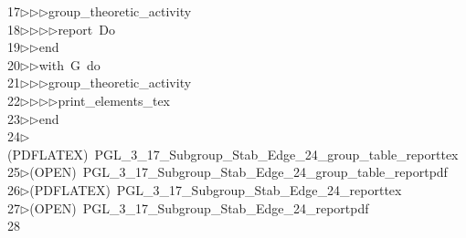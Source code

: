\begin{tabbing}
17\>$\triangleright$\>$\triangleright$\>$\triangleright$\>group\_theoretic\_activity\ \\[0pt]
18\>$\triangleright$\>$\triangleright$\>$\triangleright$\>$\triangleright$\>report\ Do\ \\[0pt]
19\>$\triangleright$\>$\triangleright$\>end\ \\[0pt]
20\>$\triangleright$\>$\triangleright$\>with\ G\ do\ \\[0pt]
21\>$\triangleright$\>$\triangleright$\>$\triangleright$\>group\_theoretic\_activity\ \\[0pt]
22\>$\triangleright$\>$\triangleright$\>$\triangleright$\>$\triangleright$\>print\_elements\_tex\ \\[0pt]
23\>$\triangleright$\>$\triangleright$\>end\\[0pt]
24\>$\triangleright$\>(PDFLATEX)\ PGL\_3\_17\_Subgroup\_Stab\_Edge\_24\_group\_table\_reporttex\\[0pt]
25\>$\triangleright$\>(OPEN)\ PGL\_3\_17\_Subgroup\_Stab\_Edge\_24\_group\_table\_reportpdf\\[0pt]
26\>$\triangleright$\>(PDFLATEX)\ PGL\_3\_17\_Subgroup\_Stab\_Edge\_24\_reporttex\\[0pt]
27\>$\triangleright$\>(OPEN)\ PGL\_3\_17\_Subgroup\_Stab\_Edge\_24\_reportpdf\\[0pt]
28\>\end{tabbing}
